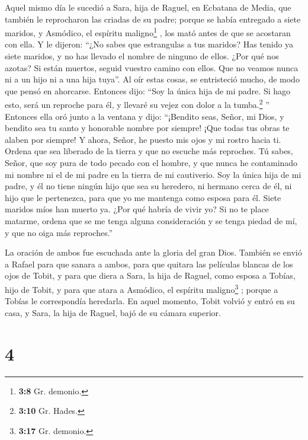  Aquel mismo día le sucedió a Sara, hija de Raguel, en
Ecbatana de Media, que también le reprocharon las criadas de su padre;
 porque se había entregado a siete maridos, y Asmódico, el
espíritu maligno\footnote{\textbf{3:8} Gr. demonio.} , los mató antes de
que se acostaran con ella. Y le dijeron: ``¿No sabes que estrangulas a
tus maridos? Has tenido ya siete maridos, y no has llevado el nombre de
ninguno de ellos.  ¿Por qué nos azotas? Si están muertos,
seguid vuestro camino con ellos. Que no veamos nunca ni a un hijo ni a
una hija tuya''.  Al oír estas cosas, se entristeció
mucho, de modo que pensó en ahorcarse. Entonces dijo: ``Soy la única
hija de mi padre. Si hago esto, será un reproche para él, y llevaré su
vejez con dolor a la tumba.\footnote{\textbf{3:10} Gr. Hades.} ''
 Entonces ella oró junto a la ventana y dijo: ``¡Bendito
seas, Señor, mi Dios, y bendito sea tu santo y honorable nombre por
siempre! ¡Que todas tus obras te alaben por siempre!  Y
ahora, Señor, he puesto mis ojos y mi rostro hacia ti. 
Ordena que sea liberado de la tierra y que no escuche más reproches.
 Tú sabes, Señor, que soy pura de todo pecado con el
hombre,  y que nunca he contaminado mi nombre ni el de mi
padre en la tierra de mi cautiverio. Soy la única hija de mi padre, y él
no tiene ningún hijo que sea su heredero, ni hermano cerca de él, ni
hijo que le pertenezca, para que yo me mantenga como esposa para él.
Siete maridos míos han muerto ya. ¿Por qué habría de vivir yo? Si no te
place matarme, ordena que se me tenga alguna consideración y se tenga
piedad de mí, y que no oiga más reproches.''

 La oración de ambos fue escuchada ante la gloria del
gran Dios.  También se envió a Rafael para que sanara a
ambos, para que quitara las películas blancas de los ojos de Tobit, y
para que diera a Sara, la hija de Raguel, como esposa a Tobías, hijo de
Tobit, y para que atara a Asmódico, el espíritu maligno\footnote{\textbf{3:17}
  Gr. demonio.} ; porque a Tobías le correspondía heredarla. En aquel
momento, Tobit volvió y entró en su casa, y Sara, la hija de Raguel,
bajó de su cámara superior.

\hypertarget{section-3}{%
\section{4}\label{section-3}}

